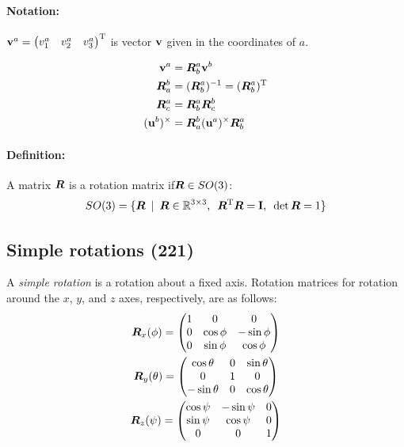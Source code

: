 \documentclass[a4paper, 12pt]{article}
\begin{document}
\paragraph{Notation:} \( \mathbf{v}^a = \begin{pmatrix} v_1^a & v_2^a & v_3^a \end{pmatrix}^{\text{T}} \) is vector \( \mathbf{v} \) given in the coordinates of \(a\).

\begin{equation}
	\begin{aligned}
		\mathbf{v}^a				&= \bm{R}_b^a \mathbf{v}^b \\
		\bm{R}_a^b				&= (\bm{R}_b^a)^{-1} = (\bm{R}_b^a)^{\text{T}} \\
		\bm{R}^a_c				&= \bm{R}^a_b \bm{R}^b_c \\
		(\mathbf{u}^b)^\times	&= \bm{R}^b_a (\mathbf{u}^a)^\times \bm{R}^a_b \\
	\end{aligned}
\end{equation}
\paragraph{Definition:} A matrix \(\bm{R}\) is a rotation matrix if\(\bm{R} \in SO(3)\):
\begin{equation}
	SO(3) = \lbrace \bm{R} \enspace |
	\enspace \bm{R} \in \mathbb{R}^{3 \times 3},
	\enspace \bm{R}^{\text{T}}\bm{R} = \mathbf{I},
	\enspace \det \bm{R} = 1 \rbrace
\end{equation}

\subsection{Simple rotations (221)}
A \emph{simple rotation} is a rotation about a fixed axis. Rotation matrices for rotation around the \( x \), \( y \), and \( z \) axes, respectively, are as follows:
\begin{gather}\label{eq:simplerot}
	\bm{R}_x(\phi) =
	\begin{pmatrix}
		1 & 0         & 0          \\
		0 & \cos \phi & -\sin \phi \\
		0 & \sin \phi & \cos \phi  \\
	\end{pmatrix} \\
	\bm{R}_y(\theta) =
	\begin{pmatrix}
		\cos \theta  & 0 & \sin \theta \\
		0            & 1 & 0           \\
		-\sin \theta & 0 & \cos \theta \\
	\end{pmatrix} \\
	\bm{R}_z(\psi) =
	\begin{pmatrix}
		\cos \psi & -\sin \psi & 0 \\
		\sin \psi & \cos \psi  & 0 \\
		0         & 0          & 1 \\
	\end{pmatrix}
\end{gather}
\end{document}
